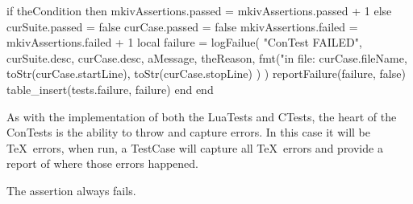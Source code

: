   if theCondition then
    mkivAssertions.passed = mkivAssertions.passed + 1
  else
    curSuite.passed = false
    curCase.passed  = false
    mkivAssertions.failed = mkivAssertions.failed + 1
    local failure = logFailue(
      "ConTest FAILED",
      curSuite.desc,
      curCase.desc,
      aMessage,
      theReason,
      fmt("in file: %
        curCase.fileName,
        toStr(curCase.startLine),
        toStr(curCase.stopLine)
      )
    )
    reportFailure(failure, false)
    table_insert(tests.failure, failure)
  end
end

\stopLuaCode

As with the implementation of both the LuaTests and CTests, the heart of 
the ConTests is the ability to throw and capture errors. In this case it 
will be \TeX\ errors, when run, a TestCase will capture all \TeX\ errors 
and provide a report of where those errors happened. 


\startMkIVCode
\def\startAssertThrowsError#1{%
  \def\startAssertionMessage{#1}
  \directlua{thirddata.contests.tests.curSuite.curCase.caughtError = false}
}

\def\stopAssertThrowsError{%
  \directlua{thirddata.contests.reportMkIVAssertion(
    thirddata.contests.tests.curSuite.curCase.caughtError,
    '\startAssertionMessage',
    'Expected an error to be thrown'
  )}
}
\stopMkIVCode

\stopTestSuite

\startTestSuite[assertDoesNotThrowError]

\startMkIVCode
\def\startAssertDoesNotThrowError#1{%
  \def\startAssertionMessage{#1}
  \directlua{thirddata.contests.tests.curSuite.curCase.caughtError = false}
}

\def\stopAssertDoesNotThrowError{%
  \directlua{thirddata.contests.reportMkIVAssertion(
    not thirddata.contests.tests.curSuite.curCase.caughtError,
    '\startAssertionMessage',
    'Expected no error to be thrown'
  )}
}
\stopMkIVCode

\stopTestSuite

\startTestSuite[assertFail]

The \type{\assertFail} assertion always fails.

\startMkIVCode
\def\assertFail#1{\assertionFailed{#1}{(Failed)}}
\stopMkIVCode

\stopTestSuite

\startTestSuite[assertSucceed]

